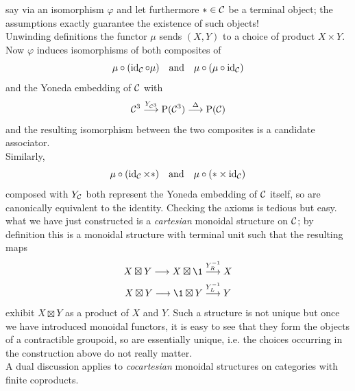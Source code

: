 \begin{enumerate}[label=\roman*)]
                say via an isomorphism $\varphi$ and let furthermore $* \in \mathcal{C}$ be a terminal object; the assumptions exactly guarantee the existence of such objects! \\
                Unwinding definitions the functor $\mu$ sends $(X, Y)$ to a choice of product $X \times Y$. Now $\varphi$ induces isomorphisms of both composites of
                \begin{equation*}
                    \mu \circ (\operatorname{id}_{\mathcal{C}} \circ \mu) \quad \text{and} \quad \mu \circ (\mu \circ \operatorname{id}_{\mathcal{C}})
                \end{equation*}
                and the Yoneda embedding of $\mathcal{C}$ with
                \begin{equation*}
                    \mathcal{C}^3 \overset{Y_{\mathcal{C}^3}}{\longrightarrow} \mathrm{P}(\mathcal{C}^3) \overset{\Delta}{\longrightarrow} \mathrm{P}(\mathcal{C})
                \end{equation*}
                and the resulting isomorphism between the two composites is a candidate associator. \\
                Similarly,
                \begin{equation*}
                    \mu \circ (\operatorname{id}_{\mathcal{C}} \times *) \quad \text{and} \quad \mu \circ (* \times \operatorname{id}_{\mathcal{C}})
                \end{equation*}
                composed with $Y_{\mathcal{C}}$ both represent the Yoneda embedding of $\mathcal{C}$ itself, so are canonically equivalent to the identity. Checking the axioms is tedious but easy.\\
                what we have just constructed is a \emph{cartesian} monoidal structure on $\mathcal{C}$; by definition this is a monoidal structure with terminal unit such that the resulting maps
                \begin{gather*}
                    X \boxtimes Y \longrightarrow X \boxtimes \1 \overset{Y^{-1}_R}{\longrightarrow} X \\
                    X \boxtimes Y \longrightarrow \1 \boxtimes Y \overset{Y^{-1}_L}{\longrightarrow} Y
                \end{gather*}
                exhibit $X \boxtimes Y$ as a product of $X$ and $Y$. Such a structure is not unique but once we have introduced monoidal functors, it is easy to see that they form the objects of a contractible groupoid, so are essentially unique, i.e. the choices occurring in the construction above do not really matter.\\
                A dual discussion applies to \emph{cocartesian} monoidal structures on categories with finite coproducts.

\end{enumerate}
